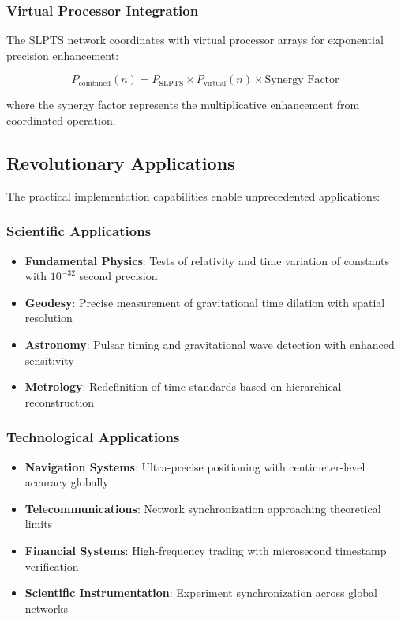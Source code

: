 \documentclass[12pt,a4paper]{article}
\begin{document}
{{{{{{{{{{{{{{\subsubsection{Virtual Processor Integration}

The SLPTS network coordinates with virtual processor arrays for exponential precision enhancement:

\begin{equation}
P_{\text{combined}}(n) = P_{\text{SLPTS}} \times P_{\text{virtual}}(n) \times \text{Synergy\_Factor}
\end{equation}

where the synergy factor represents the multiplicative enhancement from coordinated operation.

\subsection{Revolutionary Applications}

The practical implementation capabilities enable unprecedented applications:

\subsubsection{Scientific Applications}

\begin{itemize}
\item \textbf{Fundamental Physics}: Tests of relativity and time variation of constants with $10^{-32}$ second precision
\item \textbf{Geodesy}: Precise measurement of gravitational time dilation with spatial resolution
\item \textbf{Astronomy}: Pulsar timing and gravitational wave detection with enhanced sensitivity
\item \textbf{Metrology}: Redefinition of time standards based on hierarchical reconstruction
\end{itemize}

\subsubsection{Technological Applications}

\begin{itemize}
\item \textbf{Navigation Systems}: Ultra-precise positioning with centimeter-level accuracy globally
\item \textbf{Telecommunications}: Network synchronization approaching theoretical limits
\item \textbf{Financial Systems}: High-frequency trading with microsecond timestamp verification
\item \textbf{Scientific Instrumentation}: Experiment synchronization across global networks
\end{itemize}

}}}}}}}}}}}}}}
\end{document}
